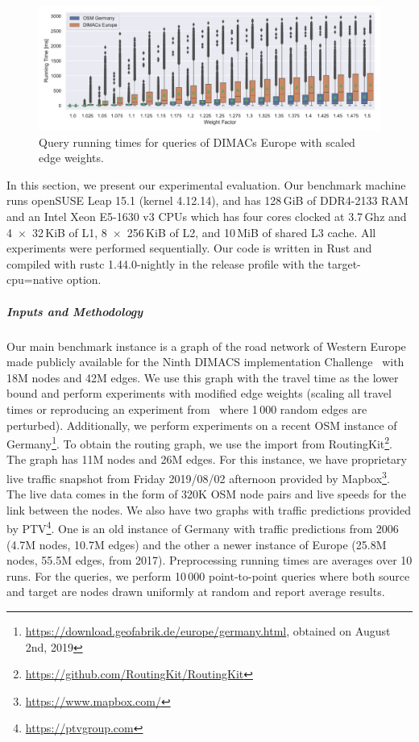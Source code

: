 \documentclass[sigconf]{acmart}
\begin{document}
\label{sec:experiments}

\begin{figure}
\centering
\includegraphics[width=\textwidth]{fig/scaled_weights.pdf}
\caption{Query running times for queries of DIMACs Europe with scaled edge weights.}\label{fig:scaled_weights}
\end{figure}

In this section, we present our experimental evaluation.
Our benchmark machine runs openSUSE Leap 15.1 (kernel 4.12.14), and has 128\,GiB of DDR4-2133 RAM and an Intel Xeon E5-1630 v3 CPUs which has four cores clocked at 3.7\,Ghz and 4~$\times$~32\,KiB of L1, 8~$\times$~256\,KiB of L2, and 10\,MiB of shared L3 cache.
All experiments were performed sequentially.
Our code is written in Rust and compiled with rustc 1.44.0-nightly in the release profile with the target-cpu=native option.

\subparagraph{Inputs and Methodology}
Our main benchmark instance is a graph of the road network of Western Europe made publicly available for the Ninth DIMACS implementation Challenge~\cite{DemetrescuGJ09} with 18M nodes and 42M edges.
We use this graph with the travel time as the lower bound and perform experiments with modified edge weights (scaling all travel times or reproducing an experiment from~\cite{dw-lbrdg-07} where 1\,000 random edges are perturbed).
Additionally, we perform experiments on a recent OSM instance of Germany\footnote{\url{https://download.geofabrik.de/europe/germany.html}, obtained on August 2nd, 2019}.
To obtain the routing graph, we use the import from RoutingKit\footnote{\url{https://github.com/RoutingKit/RoutingKit}}.
The graph has 11M nodes and 26M edges.
For this instance, we have proprietary live traffic snapshot from Friday 2019/08/02 afternoon provided by Mapbox\footnote{\url{https://www.mapbox.com/}}.
The live data comes in the form of 320K OSM node pairs and live speeds for the link between the nodes.
We also have two graphs with traffic predictions provided by PTV\footnote{\url{https://ptvgroup.com}}.
One is an old instance of Germany with traffic predictions from 2006 (4.7M nodes, 10.7M edges) and the other a newer instance of Europe (25.8M nodes, 55.5M edges, from 2017).
Preprocessing running times are averages over 10 runs.
For the queries, we perform 10\,000 point-to-point queries where both source and target are nodes drawn uniformly at random and report average results.
\end{document}
